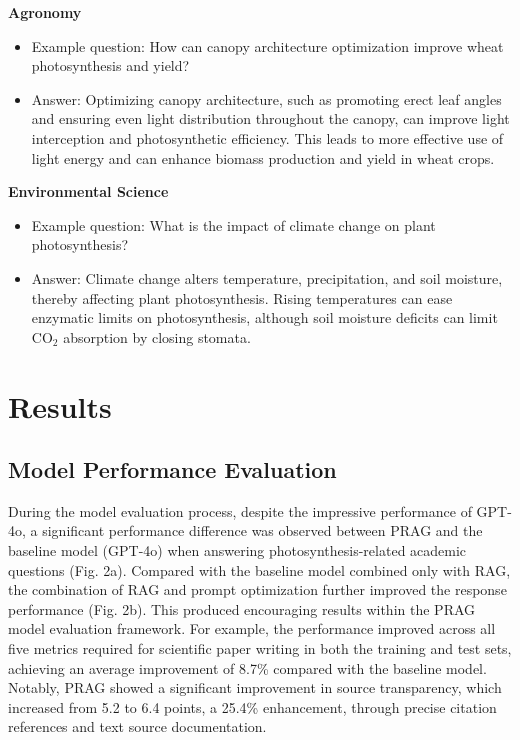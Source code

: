 \documentclass[12pt]{article}
\begin{document}
\textbf{Agronomy} \cite{ref38}
\begin{itemize}
    \item Example question: How can canopy architecture optimization improve wheat photosynthesis and yield?
    \item Answer: Optimizing canopy architecture, such as promoting erect leaf angles and ensuring even light distribution throughout the canopy, can improve light interception and photosynthetic efficiency. This leads to more effective use of light energy and can enhance biomass production and yield in wheat crops.
\end{itemize}

\textbf{Environmental Science} \cite{ref39}
\begin{itemize}
    \item Example question: What is the impact of climate change on plant photosynthesis?
    \item Answer: Climate change alters temperature, precipitation, and soil moisture, thereby affecting plant photosynthesis. Rising temperatures can ease enzymatic limits on photosynthesis, although soil moisture deficits can limit CO$_2$ absorption by closing stomata.
\end{itemize}

\section{Results}
\subsection{Model Performance Evaluation}
During the model evaluation process, despite the impressive performance of GPT-4o, a significant performance difference was observed between PRAG and the baseline model (GPT-4o) when answering photosynthesis-related academic questions (Fig. 2a). Compared with the baseline model combined only with RAG, the combination of RAG and prompt optimization further improved the response performance (Fig. 2b). This produced encouraging results within the PRAG model evaluation framework. For example, the performance improved across all five metrics required for scientific paper writing in both the training and test sets, achieving an average improvement of 8.7\% compared with the baseline model. Notably, PRAG showed a significant improvement in source transparency, which increased from 5.2 to 6.4 points, a 25.4\% enhancement, through precise citation references and text source documentation.
\end{document}
